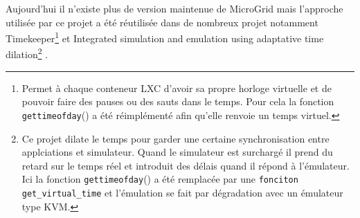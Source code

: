 Aujourd'hui il n'existe plus de version maintenue de MicroGrid mais l'approche utilisée par ce projet a été réutilisée dans de nombreux projet notamment Timekeeper\footnote{Permet à chaque conteneur LXC d'avoir sa propre horloge virtuelle et de pouvoir faire des pauses ou des sauts dans le temps. Pour cela la fonction \texttt{gettimeofday}() a été réimplémenté afin qu'elle renvoie un temps virtuel.} \citep{MICROGRID_lamps2014timekeeper} et Integrated simulation and emulation using adaptative time dilation\footnote{Ce projet  dilate le temps pour garder une certaine synchronisation entre applciations et simulateur. Quand le simulateur est surchargé il prend du retard sur le temps réel et introduit des délais quand il répond à l'émulateur. Ici la fonction \texttt{gettimeofday}() a été remplacée par une \texttt{fonciton get\_virtual\_time} et l'émulation se fait par dégradation avec un émulateur type KVM.} \citep{MICROGRID_lee2014integrated}.
